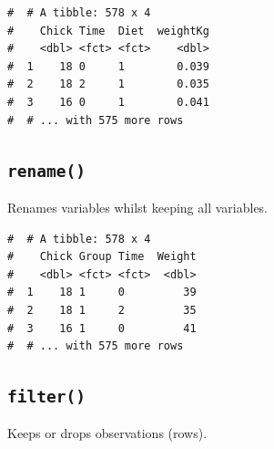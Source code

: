\documentclass[a4paper,9pt,twocolumn,twoside,printwatermark=false]{pinp}
\begin{document}
\begin{Shaded}
\begin{Highlighting}[]
\end{Highlighting}
\end{Shaded}

\begin{ShadedResult}
\begin{verbatim}
#  # A tibble: 578 x 4
#    Chick Time  Diet  weightKg
#    <dbl> <fct> <fct>    <dbl>
#  1    18 0     1        0.039
#  2    18 2     1        0.035
#  3    16 0     1        0.041
#  # ... with 575 more rows
\end{verbatim}
\end{ShadedResult}

\subsection{\texorpdfstring{\texttt{rename()}}{rename()}}\label{rename}

Renames variables whilst keeping all variables.

\begin{Shaded}
\begin{Highlighting}[]
\end{Highlighting}
\end{Shaded}

\begin{ShadedResult}
\begin{verbatim}
#  # A tibble: 578 x 4
#    Chick Group Time  Weight
#    <dbl> <fct> <fct>  <dbl>
#  1    18 1     0         39
#  2    18 1     2         35
#  3    16 1     0         41
#  # ... with 575 more rows
\end{verbatim}
\end{ShadedResult}

\subsection{\texorpdfstring{\texttt{filter()}}{filter()}}\label{filter}

Keeps or drops observations (rows).

\begin{Shaded}
\begin{Highlighting}[]
\OperatorTok{==} \OperatorTok{&}\StringTok{ }\OperatorTok{>}\NormalTok{)}
\end{Highlighting}
\end{Shaded}
\end{document}

